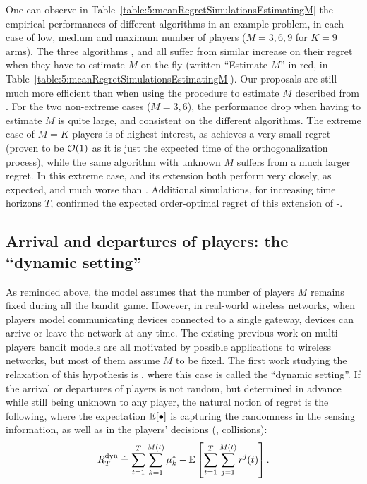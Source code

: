 One can observe in Table~\ref{table:5:meanRegretSimulationsEstimatingM} the empirical performances of different algorithms in an example problem, in each case of low, medium and maximum number of players ($M=3,6,9$ for $K=9$ arms).
The three algorithms \RhoRand, \RandTopM{} and \MCTopM{} all suffer from similar increase on their regret when they have to estimate $M$ on the fly (written ``Estimate $M$'' in red, in Table~\ref{table:5:meanRegretSimulationsEstimatingM}). Our proposals are still much more efficient than \RhoRand{} when using the procedure to estimate $M$ described from \cite{Anandkumar11}.
For the two non-extreme cases ($M=3,6$), the performance drop when having to estimate $M$ is quite large,
and consistent on the different algorithms.
The extreme case of $M=K$ players is of highest interest, as \MCTopM{} achieves a very small regret (proven to be $\mathcal{O}(1)$ as it is just the expected time of the orthogonalization process), while the same algorithm with unknown $M$ suffers from a much larger regret.
In this extreme case, \RhoRand{} and its extension both perform very closely, as expected, and much worse than \MCTopM.
%
Additional simulations, for increasing time horizons $T$, confirmed the expected order-optimal regret of this extension of \MCTopM-\klUCB.


\subsection{Arrival and departures of players: the ``dynamic setting''}
\label{sub:5:arrivalDepartures}

As reminded above, the model assumes that the number of players $M$ remains fixed during all the bandit game.
However, in real-world wireless networks, when players model communicating devices connected to a single gateway, devices can arrive or leave the network at any time.
The existing previous work on multi-players bandit models are all motivated by possible applications to wireless networks, but most of them assume $M$ to be fixed.
The first work studying the relaxation of this hypothesis is \cite{Rosenski16}, where this case is called the ``dynamic setting''.
If the arrival or departures of players is not random, but determined in advance while still being unknown to any player, the natural notion of regret is the following, where the expectation $\mathbb{E}[\bullet]$ is capturing the randomness in the sensing information, as well as in the players' decisions (\ie, collisions):
\begin{equation}\label{eq:5:defRegretDynamicSetting}
    R_T^{\text{dyn}} \overset{.}{=} \sum_{t=1}^T \sum_{k=1}^{M(t)} \mu^*_{k} - \mathbb{E}\left[ \sum_{t=1}^T \sum_{j=1}^{M(t)} r^j(t) \right].
\end{equation}

